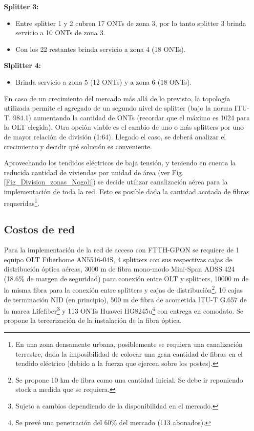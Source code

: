 \documentclass[12pt,a4paper]{book}
\begin{document}
\noindent \textbf{Splitter 3:}
\begin{itemize}
\item Entre splitter 1 y 2 cubren 17 ONTs de zona 3, por lo tanto splitter 3
brinda servicio a 10 ONTs de zona 3.
\item Con los 22 restantes brinda servicio a zona 4 (18 ONTs).
\end{itemize}

\noindent \textbf{Slplitter 4:}
\begin{itemize}
\item Brinda servicio a zona 5 (12 ONTs) y a zona 6 (18 ONTs).
\end{itemize}

\medskip

En caso de un crecimiento del mercado más allá de lo previsto, la topología
utilizada permite el agregado de un segundo nivel de splitter (bajo la norma
ITU-T. 984.1) aumentando la cantidad de ONTs (recordar que el máximo es
1024 para la OLT elegida). Otra opción viable es el cambio de uno o más
splitters por uno de mayor relación de división (1:64). Llegado el caso, se
deberá analizar el crecimiento y decidir qué solución es conveniente.

\medskip

Aprovechando los tendidos eléctricos de baja tensión, y teniendo en cuenta
la reducida cantidad de viviendas por unidad de área (ver Fig. \ref{Fig_Division_zonas_Nogoli}) se decide utilizar canalización aérea para la implementación de toda
la red. Esto es posible dada la cantidad acotada de fibras requeridas\footnote{En una zona densamente urbana, posiblemente se requiera una canalización
terrestre, dada la imposibilidad de colocar una gran cantidad de fibras en el tendido
eléctrico (debido a la fuerza que ejercen sobre los postes).}.

\medskip

\subsection{Costos de red}\label{Subsec_Costo_Red_Acc}

\medskip

Para la implementación de la red de acceso con FTTH-GPON se requiere de 1 equipo OLT Fiberhome AN5516-04S, 4 splitters con sus respectivas cajas de distribución óptica aéreas, 3000 m de fibra mono-modo Mini-Span ADSS 424 (18.6\% de margen de seguridad) para conexión entre OLT y splitters, 10000 m de la misma fibra para la conexión entre splitters y cajas de distribución\footnote{Se propone 10 km de fibra como una cantidad inicial. Se debe ir reponiendo stock a medida que se requiera.}, 10 cajas de terminación NID (en principio), 500 m de fibra de acometida ITU-T G.657 de la marca Lifefiber\footnote{Sujeto a cambios dependiendo de la disponibilidad en el mercado.} y 113 ONTs Huawei HG8245u\footnote{Se prevé una penetración del 60\% del mercado (113 abonados).} con entrega en comodato. Se propone la tercerización de la instalación de la fibra óptica. 
\end{document}
